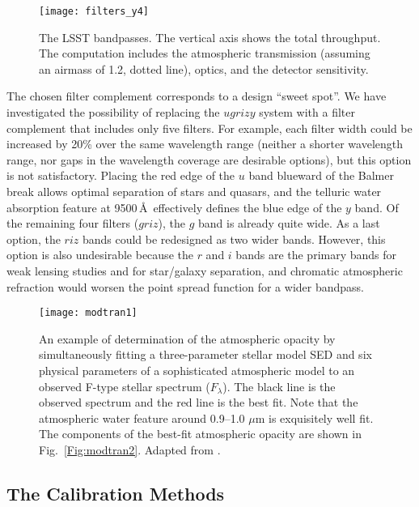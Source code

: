 \begin{figure}
\texttt{[image: filters\_y4]}
\caption{The LSST bandpasses. The vertical axis shows the total throughput. The computation
includes the atmospheric transmission (assuming an airmass of 1.2, %
dotted line), optics, and the detector sensitivity.}
\label{Fig:filters}
\end{figure}

The chosen filter complement corresponds to a design ``sweet spot''. We have
investigated the possibility of replacing the $ugrizy$ system with a
filter complement that includes only five filters. For example, each filter
width could be increased by 20\% over the same wavelength range (neither a
shorter wavelength range, nor gaps in the wavelength coverage are desirable
options), but this option is not satisfactory. Placing the red edge of the $u$
band blueward of the Balmer break allows optimal separation of stars and
quasars, and the telluric water absorption feature at 9500\,\AA\
effectively defines the blue edge of the $y$ band. Of the remaining four
filters ($griz$), the $g$ band is already quite wide. As a last option, the
$riz$ bands could be redesigned as two wider bands. However, this option is also
undesirable because the $r$ and $i$ bands are the primary bands for weak
lensing studies and for star/galaxy separation, and chromatic atmospheric
refraction would worsen the point spread function for a wider bandpass.


\begin{figure}
\texttt{[image: modtran1]}
\caption{An example of determination of the atmospheric opacity by
simultaneously fitting a three-parameter stellar model SED \citep{1979ApJS...40....1K} and
six physical parameters of a sophisticated atmospheric model \citep[MODTRAN,][]{1999SPIE.3866....2A}
to an observed F-type stellar spectrum ($F_\lambda$). The black
line is the observed spectrum and the red line is the best fit. Note that the
atmospheric water feature around 0.9--1.0 $\mu$m is exquisitely well fit.
The components of the best-fit atmospheric opacity are shown in
Fig.~\ref{Fig:modtran2}. Adapted from \citet{2010ApJ...720..811B}.}
\label{Fig:modtran1}
\end{figure}

\subsection{ The Calibration Methods }



